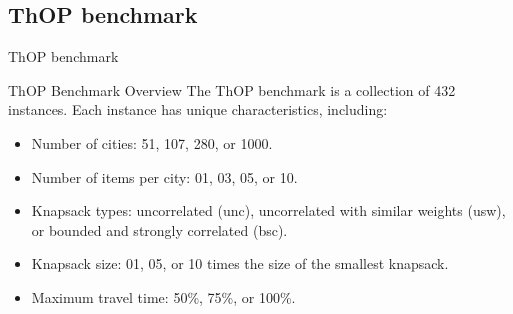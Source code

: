 \documentclass[aspectratio=169]{beamer}
\begin{document}


\subsection{ThOP benchmark}
\begin{frame}{ThOP benchmark}
    \begin{block}{ThOP Benchmark Overview}
        \justifying
        The ThOP benchmark is a collection of 432 instances. Each instance has unique characteristics, including:
        \begin{itemize}
            \item Number of cities: 51, 107, 280, or 1000.
            \item Number of items per city: 01, 03, 05, or 10.
            \item Knapsack types: uncorrelated (unc), uncorrelated with similar weights (usw), or bounded and strongly correlated (bsc).
            \item Knapsack size: 01, 05, or 10 times the size of the smallest knapsack.
            \item Maximum travel time: 50\%, 75\%, or 100\%.
        \end{itemize}
    \end{block}
\end{frame}
\end{document}
